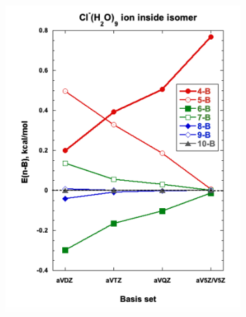 \documentclass[11pt, proquest]{uwthesis}[2020/02/24]
\begin{document}
\begin{figure}
  \begin{subfigure}[t]{.5\textwidth}
    \centering
    \includegraphics[width=\linewidth]{Figures/Chapter_3/figure_7_bl.pdf}
  \end{subfigure}
  \hfill
  \begin{subfigure}[t]{.5\textwidth}
    \centering

\end{subfigure}
\end{figure}
\end{document}
